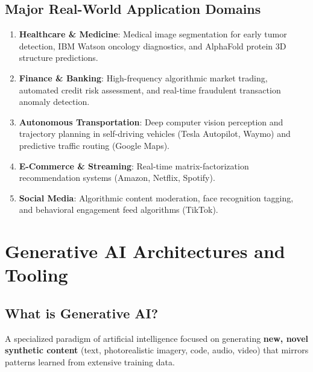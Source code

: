 \subsection{Major Real-World Application Domains}
\begin{enumerate}[leftmargin=1.5em]
    \item \textbf{Healthcare \& Medicine}: Medical image segmentation for early tumor detection, IBM Watson oncology diagnostics, and AlphaFold protein 3D structure predictions.
    \item \textbf{Finance \& Banking}: High-frequency algorithmic market trading, automated credit risk assessment, and real-time fraudulent transaction anomaly detection.
    \item \textbf{Autonomous Transportation}: Deep computer vision perception and trajectory planning in self-driving vehicles (Tesla Autopilot, Waymo) and predictive traffic routing (Google Maps).
    \item \textbf{E-Commerce \& Streaming}: Real-time matrix-factorization recommendation systems (Amazon, Netflix, Spotify).
    \item \textbf{Social Media}: Algorithmic content moderation, face recognition tagging, and behavioral engagement feed algorithms (TikTok).
\end{enumerate}

\section{Generative AI Architectures and Tooling}

\subsection{What is Generative AI?}

\begin{definition}[Generative AI]
A specialized paradigm of artificial intelligence focused on generating \textbf{new, novel synthetic content} (text, photorealistic imagery, code, audio, video) that mirrors patterns learned from extensive training data.
\end{definition}

